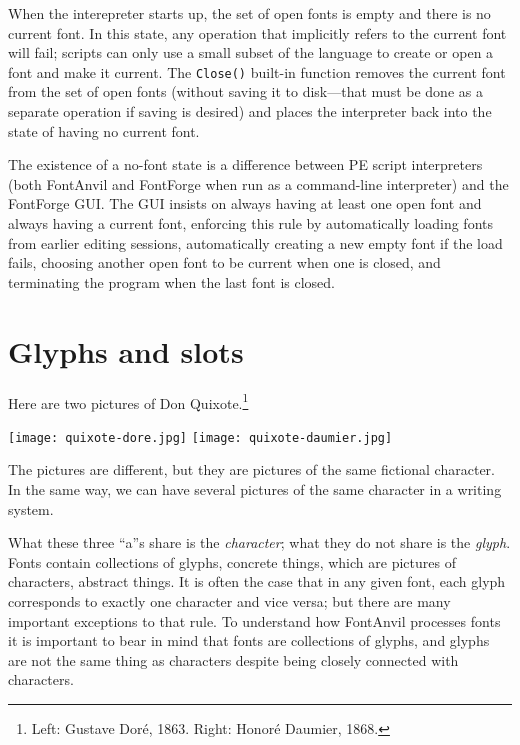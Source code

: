 When the interepreter starts up, the set of open fonts is empty and there is
no current font.  In this state, any operation that implicitly refers to the
current font will fail; scripts can only use a small subset of the language
to create or open a font and make it current.  The \texttt{Close()} built-in
function removes the current font from the set of open fonts (without saving
it to disk---that must be done as a separate operation if saving is desired)
and places the interpreter back into the state of having no current font. 

The \FFdiff existence of a no-font state is a difference between PE script
interpreters (both FontAnvil and FontForge when run as a command-line
interpreter) and the FontForge GUI.  The GUI insists on always having at
least one open font and always having a current font, enforcing this rule by
automatically loading fonts from earlier editing sessions, automatically
creating a new empty font if the load fails, choosing another open font to
be current when one is closed, and terminating the program when the last
font is closed.

\section{Glyphs and slots}

Here are two pictures of Don Quixote.\footnote{Left: Gustave
Dor\'{e}, 1863.  Right: Honor\'{e} Daumier, 1868.}

\begin{center}
\texttt{[image: quixote-dore.jpg]}\qquad
\texttt{[image: quixote-daumier.jpg]}
\end{center}

The pictures are different, but they are pictures of the same fictional
character.  In the same way, we can have several pictures of the same
character in a writing system.

\begin{center}
\scalebox{4}{a}\qquad
{}\qquad
{}
\end{center}

What these three ``a''s share is the \emph{character}; what they do not
share is the \emph{glyph}.  Fonts contain collections of glyphs, concrete
things, which are pictures of characters, abstract things.  It is often the
case that in any given font, each glyph corresponds to exactly one character
and vice versa; but there are many important exceptions to that rule.  To
understand how FontAnvil processes fonts it is important to bear in mind
that fonts are collections of glyphs, and glyphs are not the same thing as
characters despite being closely connected with characters.

